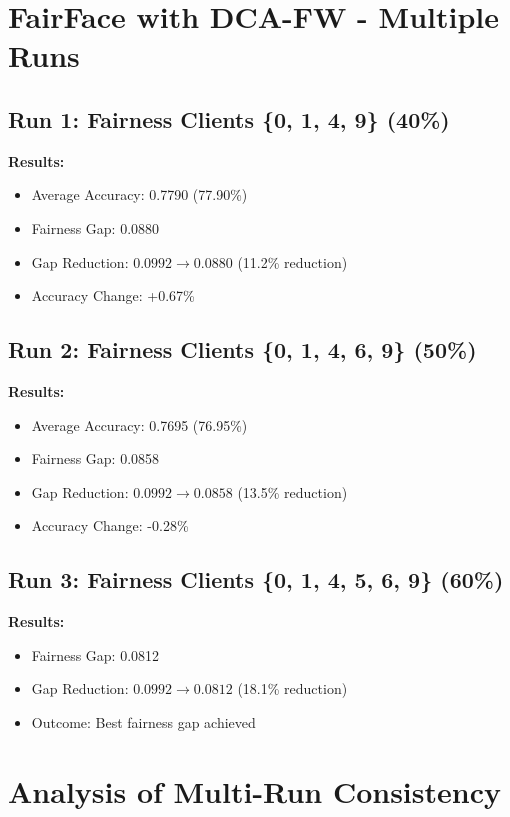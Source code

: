 \documentclass[11pt,a4paper]{report}
\begin{document}
\section{FairFace with DCA-FW - Multiple Runs}

\subsection{Run 1: Fairness Clients \{0, 1, 4, 9\} (40\%)}

\textbf{Results:}
\begin{itemize}
    \item Average Accuracy: 0.7790 (77.90\%)
    \item Fairness Gap: 0.0880
    \item Gap Reduction: $0.0992 \rightarrow 0.0880$ (11.2\% reduction)
    \item Accuracy Change: +0.67\%
\end{itemize}

\subsection{Run 2: Fairness Clients \{0, 1, 4, 6, 9\} (50\%)}

\textbf{Results:}
\begin{itemize}
    \item Average Accuracy: 0.7695 (76.95\%)
    \item Fairness Gap: 0.0858
    \item Gap Reduction: $0.0992 \rightarrow 0.0858$ (13.5\% reduction)
    \item Accuracy Change: -0.28\%
\end{itemize}

\subsection{Run 3: Fairness Clients \{0, 1, 4, 5, 6, 9\} (60\%)}

\textbf{Results:}
\begin{itemize}
    \item Fairness Gap: 0.0812
    \item Gap Reduction: $0.0992 \rightarrow 0.0812$ (18.1\% reduction)
    \item Outcome: Best fairness gap achieved
\end{itemize}

\section{Analysis of Multi-Run Consistency}
\end{document}
